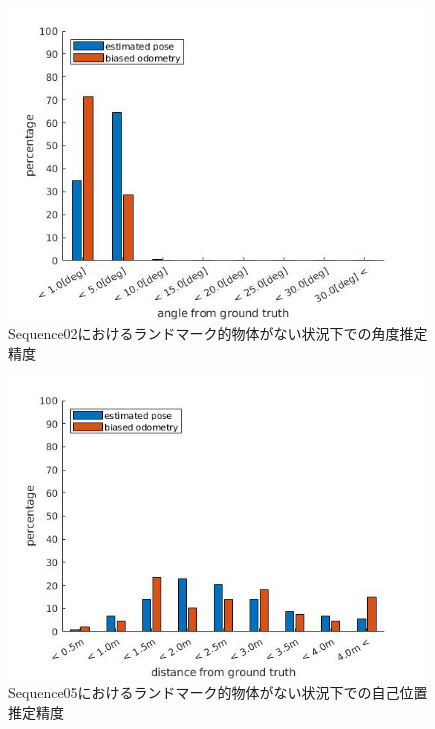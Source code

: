 \begin{figure}[htbp]
 \begin{minipage}{1.0\hsize}
  \begin{center}
   \includegraphics[width=110mm]{./picture/no_car_s2_rpy.jpg}
  \end{center}
  \caption{Sequence02におけるランドマーク的物体がない状況下での角度推定精度}
  \label{fig:no_car_s2_rpy}
 \end{minipage}
\end{figure}

\begin{figure}[htbp]
 \begin{minipage}{1.0\hsize}
  \begin{center}
   \includegraphics[width=110mm]{./picture/no_car_s5_xyz.jpg}
  \end{center}
  \caption{Sequence05におけるランドマーク的物体がない状況下での自己位置推定精度}
  \label{fig:no_car_s5_xyz}
 \end{minipage}
\end{figure}

